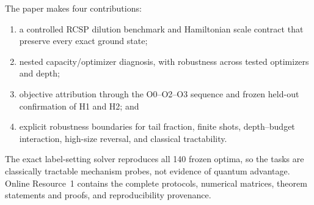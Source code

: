 The paper makes four contributions:

\begin{enumerate}[label=(C\arabic*)]
  \item a controlled RCSP dilution benchmark and Hamiltonian scale contract
        that preserve every exact ground state;
  \item nested capacity/optimizer diagnosis, with robustness across tested
        optimizers and depth;
  \item objective attribution through the O0--O2--O3 sequence and frozen
        held-out confirmation of H1 and H2; and
  \item explicit robustness boundaries for tail fraction, finite shots,
        depth--budget interaction, high-size reversal, and classical
        tractability.
\end{enumerate}

The exact label-setting solver reproduces all 140 frozen optima, so the tasks
are classically tractable mechanism probes, not evidence of quantum advantage.
Online Resource~1 contains the complete protocols, numerical matrices,
theorem statements and proofs, and reproducibility provenance.
